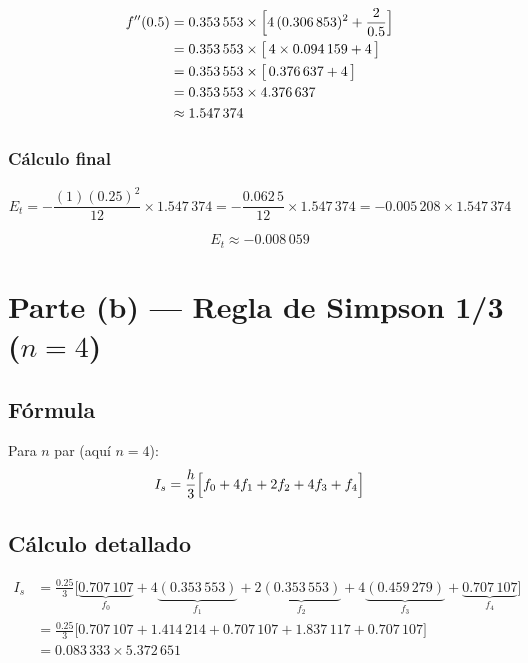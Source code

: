 \documentclass[12pt,a4paper]{article}
\begin{document}
\begin{align*}
  f''(0.5)
  &= 0.353\,553 \times \Bigl[4\,(0.306\,853)^2 + \frac{2}{0.5}\Bigr] \\
  &= 0.353\,553 \times \bigl[\,4 \times 0.094\,159 + 4\,\bigr] \\
  &= 0.353\,553 \times \bigl[\,0.376\,637 + 4\,\bigr] \\
  &= 0.353\,553 \times 4.376\,637 \\
  &\approx 1.547\,374
\end{align*}

\subsubsection*{C\'alculo final}

\[
  E_t = -\frac{(1)(0.25)^2}{12}\times 1.547\,374
      = -\frac{0.062\,5}{12}\times 1.547\,374
      = -0.005\,208\times 1.547\,374
\]

\[
  \boxed{E_t \approx -0.008\,059}
\]


\section*{Parte (b) --- Regla de Simpson 1/3 ($n=4$)}

\subsection*{F\'ormula}

Para $n$ par (aqu\'i $n=4$):
\[
  I_s = \frac{h}{3}\Bigl[f_0 + 4f_1 + 2f_2 + 4f_3 + f_4\Bigr]
\]

\subsection*{C\'alculo detallado}

\begin{align*}
  I_s &= \frac{0.25}{3}\bigl[
         \underbrace{0.707\,107}_{f_0}
         + 4\underbrace{(0.353\,553)}_{f_1}
         + 2\underbrace{(0.353\,553)}_{f_2}
         + 4\underbrace{(0.459\,279)}_{f_3}
         + \underbrace{0.707\,107}_{f_4}\bigr] \\[6pt]
      &= \frac{0.25}{3}\bigl[
         0.707\,107
         + 1.414\,214
         + 0.707\,107
         + 1.837\,117
         + 0.707\,107\bigr] \\[4pt]
      &= 0.083\,333 \times 5.372\,651
\end{align*}
\end{document}

